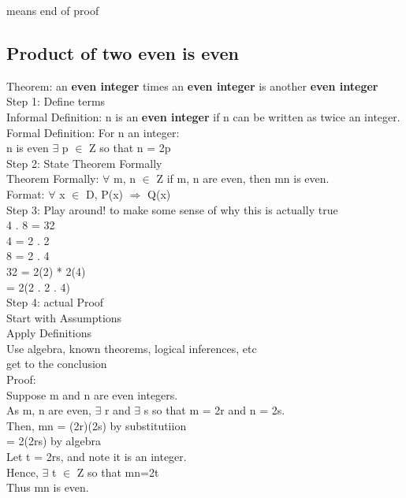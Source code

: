\documentclass[11pt]{article}
\begin{document}
means end of proof \square\\
\subsection{Product of two even is even}
\label{sec:orgbfbc0ce}
Theorem: an \textbf{even integer} times an \textbf{even integer} is another \textbf{even integer}\\

Step 1: Define terms\\
Informal Definition: n is an \textbf{even integer} if n can be written as twice an integer.\\
Formal Definition: For n an integer:\\
n is even \iff \(\exists\) p \(\in\) Z so that n = 2p\\

Step 2: State Theorem Formally\\
Theorem Formally: \(\forall\) m, n \(\in\) Z if m, n are even, then mn is even.\\

Format: \(\forall\) x \(\in\) D, P(x) \(\Rightarrow\) Q(x)\\

Step 3: Play around! to make some sense of why this is actually true\\
4 . 8 = 32\\
4 =  2 . 2\\
8 = 2 . 4\\
32 = 2(2) * 2(4)\\
= 2(2 . 2 . 4)\\

Step 4: actual Proof\\

Start with Assumptions\\

Apply Definitions\\

Use algebra, known theorems, logical inferences, etc\\

get to the conclusion\\

Proof:\\
Suppose m and n are even integers.\\
As m, n are even, \(\exists\) r and \(\exists\) s so that m = 2r and n = 2s.\\
Then, mn = (2r)(2s) by substitutiion\\
= 2(2rs) by algebra\\
Let t = 2rs, and note it is an integer.\\
Hence, \(\exists\) t \(\in\) Z so that mn=2t\\
Thus mn is even.\\
\square\\
\end{document}
